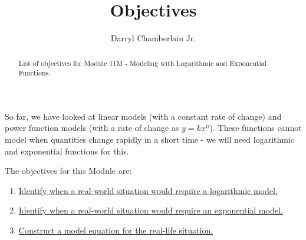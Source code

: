 \documentclass{ximera}
\author{Darryl Chamberlain Jr.}
\title{Objectives}
\begin{document}
\begin{abstract}
List of objectives for Module 11M - Modeling with Logarithmic and Exponential Functions.
\end{abstract}
\maketitle

So far, we have looked at linear models (with a constant rate of change) and power function models (with a rate of change as $y = k x^n$). These functions cannot model when quantities change rapidly in a short time - we will need logarithmic and exponential functions for this. 

The objectives for this Module are: 
\begin{enumerate}
    \item \href{https://cnx.org/contents/mwjClAV_@8.21:_tqWoaDz@17/Exponential-and-Logarithmic-Models}{Identify when a real-world situation would require a logarithmic model.}
	\item \href{https://cnx.org/contents/mwjClAV_@8.21:_tqWoaDz@17/Exponential-and-Logarithmic-Models}{Identify when a real-world situation would require an exponential model.}
	\item \href{https://cnx.org/contents/mwjClAV_@8.21:_tqWoaDz@17/Exponential-and-Logarithmic-Models}{Construct a model equation for the real-life situation.} 
\end{enumerate}
\end{document}

